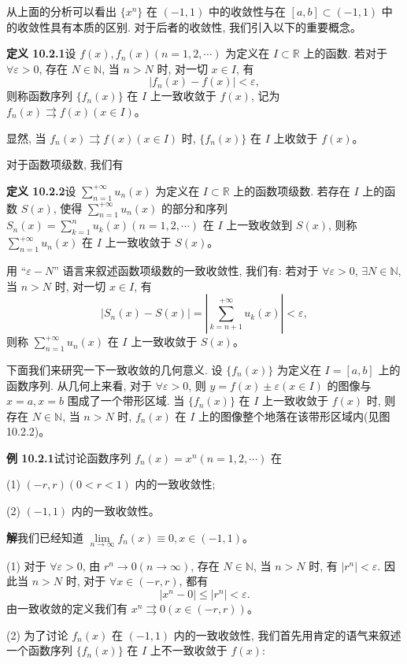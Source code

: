 \documentclass[UTF8,12pt,a4paper,fontset=fandol]{ctexart}
\begin{document}
从上面的分析可以看出 $\{x^n\}$ 在 $(-1,1)$ 中的收敛性与在 $[a,b]\subset(-1,1)$ 中的收敛性具有本质的区别. 对于后者的收敛性, 我们引入以下的重要概念。

\noindent\textbf{定义 10.2.1}\quad 设 $f(x),f_n(x)(n=1,2,\cdots)$ 为定义在 $I\subset\mathbb R$ 上的函数. 若对于 $\forall\varepsilon>0$, 存在 $N\in\mathbb N$, 当 $n>N$ 时, 对一切 $x\in I$, 有
\[
  |f_n(x)-f(x)|<\varepsilon,
\]
则称函数序列 $\{f_n(x)\}$ 在 $I$ 上一致收敛于 $f(x)$, 记为 $f_n(x)\rightrightarrows f(x)(x\in I)$。

显然, 当 $f_n(x)\rightrightarrows f(x)(x\in I)$ 时, $\{f_n(x)\}$ 在 $I$ 上收敛于 $f(x)$。

对于函数项级数, 我们有

\noindent\textbf{定义 10.2.2}\quad 设 $\sum\limits_{n=1}^{+\infty}u_n(x)$ 为定义在 $I\subset\mathbb R$ 上的函数项级数. 若存在 $I$ 上的函数 $S(x)$, 使得 $\sum\limits_{n=1}^{+\infty}u_n(x)$ 的部分和序列 $S_n(x)=\sum\limits_{k=1}^n u_k(x)(n=1,2,\cdots)$ 在 $I$ 上一致收敛到 $S(x)$, 则称 $\sum\limits_{n=1}^{+\infty}u_n(x)$ 在 $I$ 上一致收敛于 $S(x)$。

用 ``$\varepsilon-N$'' 语言来叙述函数项级数的一致收敛性, 我们有: 若对于 $\forall\varepsilon>0$, $\exists N\in\mathbb N$, 当 $n>N$ 时, 对一切 $x\in I$, 有
\[
  |S_n(x)-S(x)|=\left|\sum_{k=n+1}^{+\infty}u_k(x)\right|<\varepsilon,
\]
则称 $\sum\limits_{n=1}^{+\infty}u_n(x)$ 在 $I$ 上一致收敛于 $S(x)$。

下面我们来研究一下一致收敛的几何意义. 设 $\{f_n(x)\}$ 为定义在 $I=[a,b]$ 上的函数序列. 从几何上来看, 对于 $\forall\varepsilon>0$, 则 $y=f(x)\pm\varepsilon(x\in I)$ 的图像与 $x=a,x=b$ 围成了一个带形区域. 当 $\{f_n(x)\}$ 在 $I$ 上一致收敛于 $f(x)$ 时, 则存在 $N\in\mathbb N$, 当 $n>N$ 时, $f_n(x)$ 在 $I$ 上的图像整个地落在该带形区域内(见图 10.2.2)。

\noindent\textbf{例 10.2.1}\quad 试讨论函数序列 $f_n(x)=x^n(n=1,2,\cdots)$ 在

(1) $(-r,r)(0<r<1)$ 内的一致收敛性;

(2) $(-1,1)$ 内的一致收敛性。

\noindent\textbf{解}\quad 我们已经知道 $\lim\limits_{n\to\infty}f_n(x)\equiv0,x\in(-1,1)$。

(1) 对于 $\forall\varepsilon>0$, 由 $r^n\to0(n\to\infty)$, 存在 $N\in\mathbb N$, 当 $n>N$ 时, 有 $|r^n|<\varepsilon$. 因此当 $n>N$ 时, 对于 $\forall x\in(-r,r)$, 都有
\[
  |x^n-0|\leq |r^n|<\varepsilon.
\]
由一致收敛的定义我们有 $x^n\rightrightarrows0(x\in(-r,r))$。

(2) 为了讨论 $f_n(x)$ 在 $(-1,1)$ 内的一致收敛性, 我们首先用肯定的语气来叙述一个函数序列 $\{f_n(x)\}$ 在 $I$ 上不一致收敛于 $f(x)$:
\end{document}
